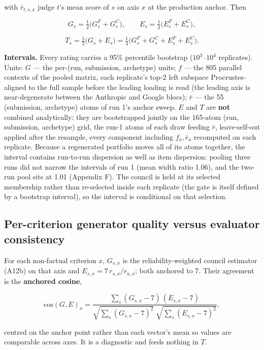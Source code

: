 \documentclass{article}
\begin{document}
with \(\bar r_{t,s,x}\) judge \(t\)'s mean score of \(s\) on axis \(x\) at the production anchor. Then

\[ G_s=\tfrac12\big(G^{F}_s+G^{C}_s\big),\qquad E_s=\tfrac12\big(E^{F}_s+E^{C}_s\big), \tag{A13}\]

\[ T_s=\tfrac12\big(G_s+E_s\big)=\tfrac14\big(G^{F}_s+G^{C}_s+E^{F}_s+E^{C}_s\big). \tag{A14}\]

\textbf{Intervals.} Every rating carries a 95\% percentile bootstrap (\(10^3\)--\(10^4\) replicates). Units: \(G\) --- the per-(run, submission, archetype) units; \(f\) --- the 805 parallel contexts of the pooled matrix, each replicate's top-2 left subspace Procrustes-aligned to the full sample before the leading loading is read (the leading axis is near-degenerate between the Anthropic and Google blocs); \(\bar r\) --- the 55 (submission, archetype) atoms of run 1's anchor sweep. \(E\) and \(T\) are \textbf{not} combined analytically: they are bootstrapped jointly on the 165-atom (run, submission, archetype) grid, the run-1 atoms of each draw feeding \(\bar r\), leave-self-out applied after the resample, every component including \(f_a,\bar r_a\) recomputed on each replicate. Because a regenerated portfolio moves all of its atoms together, the interval contains run-to-run dispersion as well as item dispersion: pooling three runs did not narrow the intervals of run 1 (mean width ratio 1.06), and the two-run pool sits at 1.01 (Appendix F). The council is held at its selected membership rather than re-selected inside each replicate (the gate is itself defined by a bootstrap interval), so the interval is conditional on that selection.

\subsection{Per-criterion generator quality versus evaluator consistency}\label{per-criterion-generator-quality-versus-evaluator-consistency}

For each non-factual criterion \(x\), \(G_{s,x}\) is the reliability-weighted council estimator (A12b) on that axis and \(E_{s,x}=7\,r_{s,x}/r_{a,x}\); both anchored to 7. Their agreement is the \textbf{anchored cosine},

\[ \mathrm{cos}(G,E)_x=\frac{\sum_{s}(G_{s,x}-7)\,(E_{s,x}-7)}{\sqrt{\sum_{s}(G_{s,x}-7)^2}\;\sqrt{\sum_{s}(E_{s,x}-7)^2}}, \tag{A15}\]

centred on the anchor point rather than each vector's mean so values are comparable across axes. It is a diagnostic and feeds nothing in \(T\).
\end{document}

